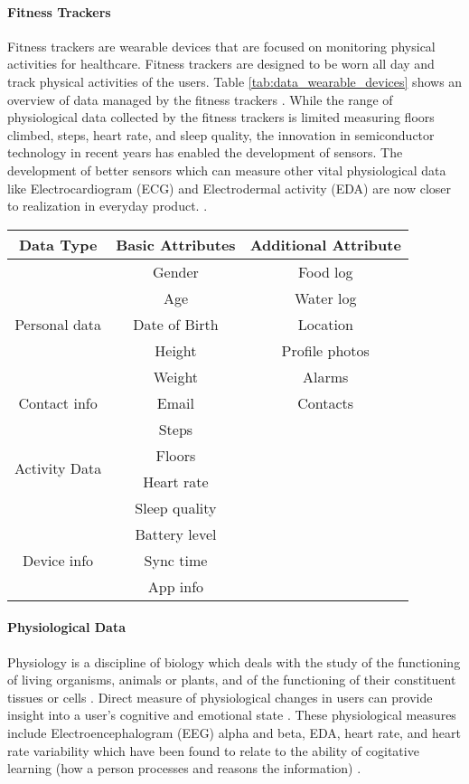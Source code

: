 \paragraph{Fitness Trackers}
Fitness trackers are wearable devices that are focused on monitoring physical activities for healthcare. Fitness trackers are designed to be worn all day and track physical activities of the users. Table \ref{tab:data_wearable_devices} shows an overview of data managed by the fitness trackers \cite{mendoza_assessment_2018}. While the range of physiological data collected by the fitness trackers is limited measuring floors climbed, steps, heart rate, and sleep quality, the innovation in semiconductor technology in recent years has enabled the development of sensors. The development of better sensors which can measure other vital physiological data like Electrocardiogram (ECG) and Electrodermal activity (EDA) are now closer to realization in everyday product. \cite{haghi_wearable_2017}. 

\begin{center}
\begin{tabular}{ |c|c|c| }
\hline
\textbf{Data Type} & \textbf{Basic Attributes} & \textbf{Additional Attribute} \\
\hline
\hline
\multirow{5}{8em}{Personal data} & Gender & Food log \\ 
& Age & Water log \\ 
& Date of Birth & Location \\ 
& Height & Profile photos \\ 
& Weight & Alarms \\ 
\hline
\multirow{1}{8em}{Contact info} & Email & Contacts \\
\hline
\multirow{4}{8em}{Activity Data} & Steps &  \\
& Floors & \\
& Heart rate & \\
& Sleep quality & \\
\hline
\multirow{3}{8em}{Device info} & Battery level & \\
& Sync time & \\
& App info & \\
\hline
\end{tabular}
\label{tab:data_wearable_devices}
\end{center}

 \paragraph{Physiological Data} Physiology is a discipline of biology which deals with the study of the functioning of living organisms, animals or plants, and of the functioning of their constituent tissues or cells \cite{scheer_physiology_nodate}. Direct measure of physiological changes in users can provide insight into a user's cognitive and emotional state \cite{benbasat_incorporating_nodate}. These physiological measures include Electroencephalogram (EEG) alpha and beta, EDA, heart rate, and heart rate variability which have been found to relate to the ability of cogitative learning (how a person processes and reasons the information) \cite{leger_neurophysiological_2014}.
 
